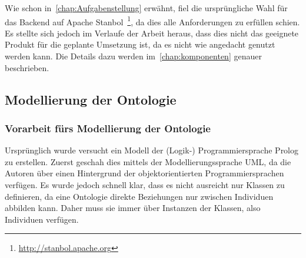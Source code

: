 Wie schon in~\autoref{chap:Aufgabenstellung} erwähnt, fiel die ursprüngliche Wahl für das Backend auf Apache Stanbol~\footnote{\url{http://stanbol.apache.org}}, da dies alle Anforderungen zu erfüllen schien. Es stellte sich jedoch im Verlaufe der Arbeit heraus, dass dies nicht das geeignete Produkt für die geplante Umsetzung ist, da es nicht wie angedacht genutzt werden kann. Die Details dazu werden im~\autoref{chap:komponenten} genauer beschrieben.

\newpage

\subsection{Modellierung der Ontologie}
\label{sub:modellierung_der_ontologie}

\subsubsection{Vorarbeit fürs Modellierung der Ontologie}
\label{sub:modellierung_der_ontologie_vorarbeit}
Ursprünglich wurde versucht ein Modell der (Logik-) Programmiersprache Prolog zu erstellen. Zuerst geschah dies mittels der Modellierungssprache UML, da die Autoren über einen Hintergrund der objektorientierten Programmiersprachen verfügen. Es wurde jedoch schnell klar, dass es nicht ausreicht nur Klassen zu definieren, da eine Ontologie direkte Beziehungen nur zwischen Individuen abbilden kann. Daher muss sie immer über Instanzen der Klassen, also Individuen verfügen.

